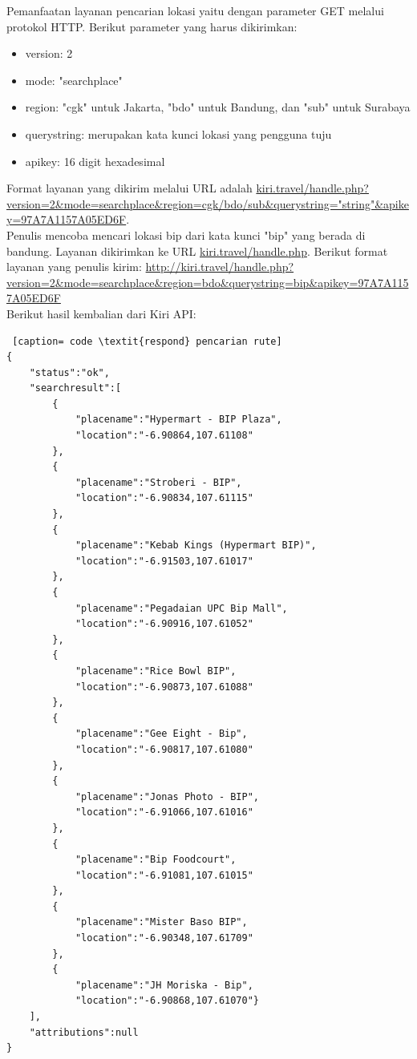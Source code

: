 \hspace{0.5cm} Pemanfaatan layanan pencarian lokasi yaitu dengan parameter GET melalui protokol HTTP. Berikut parameter yang harus dikirimkan:
\begin{itemize}
	\item version: 2
	\item mode: "searchplace"
	\item region: "cgk" untuk Jakarta, "bdo" untuk Bandung, dan "sub" untuk Surabaya
	\item querystring: merupakan kata kunci lokasi yang pengguna tuju
	\item apikey: 16 digit hexadesimal
\end{itemize}
Format layanan yang dikirim melalui URL adalah \url{kiri.travel/handle.php?version=2&mode=searchplace&region=cgk/bdo/sub&querystring="string"&apikey=97A7A1157A05ED6F}.
\newline
\\Penulis mencoba mencari lokasi bip dari kata kunci "bip" yang berada di bandung. Layanan dikirimkan ke URL \url{kiri.travel/handle.php}. 
Berikut format layanan yang penulis kirim:\newline
{\url{http://kiri.travel/handle.php?version=2&mode=searchplace&region=bdo&querystring=bip&apikey=97A7A1157A05ED6F}}
\newline
\\Berikut hasil kembalian dari Kiri API: 

\begin{lstlisting} [caption= code \textit{respond} pencarian rute]
{ 
	"status":"ok",
	"searchresult":[
		{
			"placename":"Hypermart - BIP Plaza",
			"location":"-6.90864,107.61108"
		},
		{
			"placename":"Stroberi - BIP",
			"location":"-6.90834,107.61115"
		},
		{
			"placename":"Kebab Kings (Hypermart BIP)",
			"location":"-6.91503,107.61017"
		},
		{
			"placename":"Pegadaian UPC Bip Mall",
			"location":"-6.90916,107.61052"
		},
		{
			"placename":"Rice Bowl BIP",
			"location":"-6.90873,107.61088"
		},
		{	
			"placename":"Gee Eight - Bip",
			"location":"-6.90817,107.61080"
		},
		{
			"placename":"Jonas Photo - BIP",
			"location":"-6.91066,107.61016"
		},
		{
			"placename":"Bip Foodcourt",
			"location":"-6.91081,107.61015"
		},
		{
			"placename":"Mister Baso BIP",
			"location":"-6.90348,107.61709"
		},
		{
			"placename":"JH Moriska - Bip",
			"location":"-6.90868,107.61070"}
	],
	"attributions":null
}
\end{lstlisting}

